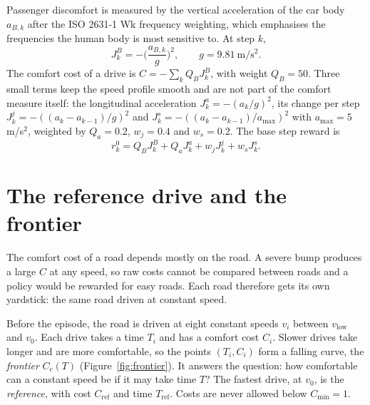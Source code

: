 \documentclass[11pt]{article}
\begin{document}
Passenger discomfort is measured by the vertical acceleration of the car body $a_{B,k}$ after the ISO 2631-1 Wk frequency weighting, which emphasises the frequencies the human body is most sensitive to. At step $k$,
\begin{equation}
J^{B}_k = -\Big(\frac{a_{B,k}}{g}\Big)^{2}, \qquad g = 9.81\ \mathrm{m/s^2}.
\end{equation}
The comfort cost of a drive is $C = -\sum_k Q_B J^{B}_k$, with weight $Q_B = 50$. Three small terms keep the speed profile smooth and are not part of the comfort measure itself: the longitudinal acceleration $J^{a}_k = -(a_k/g)^2$, its change per step $J^{j}_k = -((a_k - a_{k-1})/g)^2$ and $J^{s}_k = -((a_k - a_{k-1})/a_{\max})^2$ with $a_{\max} = 5$\,m/s$^2$, weighted by $Q_a = 0.2$, $w_j = 0.4$ and $w_s = 0.2$. The base step reward is
\begin{equation}
r^{0}_k = Q_B J^{B}_k + Q_a J^{a}_k + w_j J^{j}_k + w_s J^{s}_k .
\end{equation}

\section{The reference drive and the frontier}

The comfort cost of a road depends mostly on the road. A severe bump produces a large $C$ at any speed, so raw costs cannot be compared between roads and a policy would be rewarded for easy roads. Each road therefore gets its own yardstick: the same road driven at constant speed.

Before the episode, the road is driven at eight constant speeds $v_i$ between $v_{\text{low}}$ and $v_0$. Each drive takes a time $T_i$ and has a comfort cost $C_i$. Slower drives take longer and are more comfortable, so the points $(T_i, C_i)$ form a falling curve, the \emph{frontier} $C_c(T)$ (Figure~\ref{fig:frontier}). It answers the question: how comfortable can a constant speed be if it may take time $T$? The fastest drive, at $v_0$, is the \emph{reference}, with cost $C_{\text{ref}}$ and time $T_{\text{ref}}$. Costs are never allowed below $C_{\min} = 1$.
\end{document}
